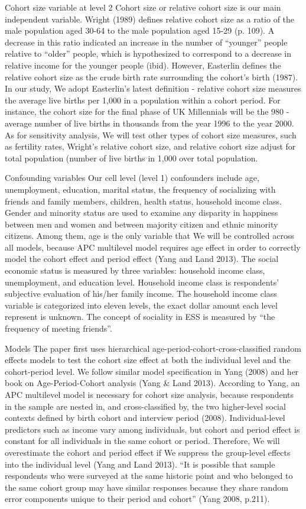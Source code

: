 Cohort size variable at level 2
Cohort size or relative cohort size is our main independent variable. Wright (1989) defines relative cohort size as a ratio of the male population aged 30-64 to the male population aged 15-29 (p. 109). A decrease in this ratio indicated an increase in the number of “younger” people relative to “older” people, which is hypothesized to correspond to a decrease in relative income for the younger people (ibid). However, Easterlin defines the relative cohort size as the crude birth rate surrounding the cohort’s birth (1987). In our study, We adopt Easterlin’s latest definition - relative cohort size measures the average live births per 1,000 in a population within a cohort period. For instance, the cohort size for the final phase of UK Millennials will be the 980 - average number of live births in thousands from the year 1996 to the year 2000. As for sensitivity analysis, We will test other types of cohort size measures, such as fertility rates, Wright’s relative cohort size, and relative cohort size adjust for total population (number of live births in 1,000 over total population.

Confounding variables
Our cell level (level 1) confounders include age, unemployment, education, marital status, the frequency of socializing with friends and family members, children, health status, household income class. Gender and minority status are used to examine any disparity in happiness between men and women and between majority citizen and ethnic minority citizens. Among them, age is the only variable that We will be controlled across all models, because APC multilevel model requires age effect in order to correctly model the cohort effect and period effect (Yang and Land 2013). The social economic status is measured by three variables: household income class, unemployment, and education level. Household income class is respondents’ subjective evaluation of his/her family income. The household income class variable is categorized into eleven levels, the exact dollar amount each level represent is unknown.  The concept of sociality in ESS is measured by “the frequency of meeting friends”. 

Models
The paper first uses hierarchical age-period-cohort-cross-classified random effects models to test the cohort size effect at both the individual level and the cohort-period level. We follow similar model specification in Yang (2008) and her book on Age-Period-Cohort analysis (Yang & Land 2013).  According to Yang, an APC multilevel model is necessary for cohort size analysis, because respondents in the sample are nested in, and cross-classified by, the two higher-level social contexts defined by birth cohort and interview period (2008). Individual-level predictors such as income vary among individuals, but cohort and period effect is constant for all individuals in the same cohort or period. Therefore, We will overestimate the cohort and period effect if We suppress the group-level effects into the individual level (Yang and Land 2013). “It is possible that sample respondents who were surveyed at the same historic point and who belonged to the same cohort group may have similar responses because they share random error components unique to their period and cohort” (Yang 2008, p.211). 

